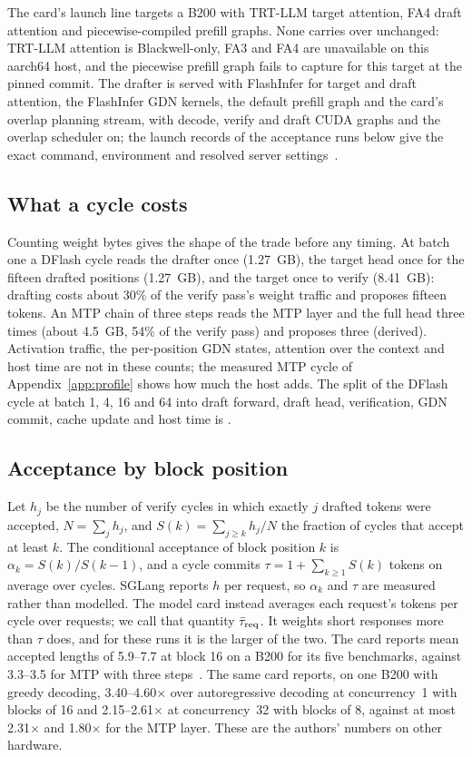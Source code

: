 The card's launch line targets a B200 with TRT-LLM target attention, FA4 draft attention and piecewise-compiled prefill graphs. None carries over unchanged: TRT-LLM attention is Blackwell-only, FA3 and FA4 are unavailable on this aarch64 host, and the piecewise prefill graph fails to capture for this target at the pinned commit. The drafter is served with FlashInfer for target and draft attention, the FlashInfer GDN kernels, the default prefill graph and the card's overlap planning stream, with decode, verify and draft CUDA graphs and the overlap scheduler on; the launch records of the acceptance runs below give the exact command, environment and resolved server settings~.

\subsection{What a cycle costs}\label{app:drafter-cost}\label{sec:drafter-cost}
Counting weight bytes gives the shape of the trade before any timing. At batch one a DFlash cycle reads the drafter once (1.27~GB), the target head once for the fifteen drafted positions (1.27~GB), and the target once to verify (8.41~GB): drafting costs about 30\% of the verify pass's weight traffic and proposes fifteen tokens. An MTP chain of three steps reads the MTP layer and the full head three times (about 4.5~GB, 54\% of the verify pass) and proposes three (derived). Activation traffic, the per-position GDN states, attention over the context and host time are not in these counts; the measured MTP cycle of Appendix~\ref{app:profile} shows how much the host adds. The split of the DFlash cycle at batch 1, 4, 16 and 64 into draft forward, draft head, verification, GDN commit, cache update and host time is .

\subsection{Acceptance by block position}\label{app:drafter-acceptance}\label{sec:drafter-acceptance}
Let $h_j$ be the number of verify cycles in which exactly $j$ drafted tokens were accepted, $N=\sum_jh_j$, and $S(k)=\sum_{j\ge k}h_j/N$ the fraction of cycles that accept at least $k$. The conditional acceptance of block position $k$ is $\alpha_k=S(k)/S(k-1)$, and a cycle commits $\tau=1+\sum_{k\ge1}S(k)$ tokens on average over cycles. SGLang reports $h$ per request, so $\alpha_k$ and $\tau$ are measured rather than modelled. The model card instead averages each request's tokens per cycle over requests; we call that quantity $\bar\tau_{\rm req}$. It weights short responses more than $\tau$ does, and for these runs it is the larger of the two. The card reports mean accepted lengths of 5.9--7.7 at block 16 on a B200 for its five benchmarks, against 3.3--3.5 for MTP with three steps~\cite{dflash4bcard}. The same card reports, on one B200 with greedy decoding, 3.40--4.60$\times$ over autoregressive decoding at concurrency~1 with blocks of 16 and 2.15--2.61$\times$ at concurrency~32 with blocks of 8, against at most 2.31$\times$ and 1.80$\times$ for the MTP layer. These are the authors' numbers on other hardware.

